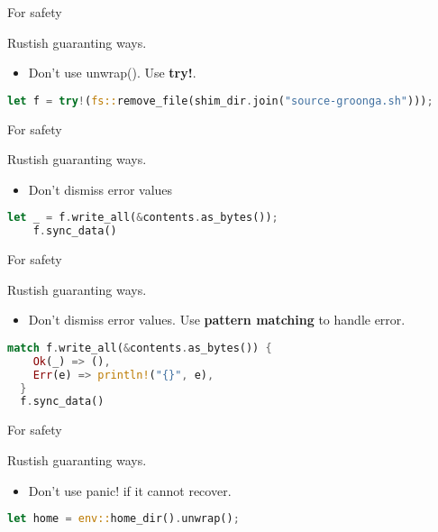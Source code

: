 \documentclass[12pt, unicode]{beamer}
\begin{document}
\begin{frame}[fragile]{For safety}
  \begin{block}{}
    Rustish guaranting ways.
  \end{block}
\begin{itemize}
\item<1-> Don't use unwrap(). Use \textbf{try!}.
\end{itemize}
  \begin{lstlisting}[language={Rust},basicstyle=\ttfamily\SSmall]
    let f = try!(fs::remove_file(shim_dir.join("source-groonga.sh")));
  \end{lstlisting}
\end{frame}

\begin{frame}[fragile]{For safety}
  \begin{block}{}
    Rustish guaranting ways.
  \end{block}
\begin{itemize}
\item<1-> Don't dismiss error values
\end{itemize}
  \begin{lstlisting}[language={Rust},basicstyle=\ttfamily\SSmall]
    let _ = f.write_all(&contents.as_bytes());
    f.sync_data()
  \end{lstlisting}
\end{frame}

\begin{frame}[fragile]{For safety}
  \begin{block}{}
    Rustish guaranting ways.
  \end{block}
\begin{itemize}
\item<1-> Don't dismiss error values. Use \textbf{pattern matching} to handle error.
\end{itemize}
\begin{lstlisting}[language={Rust},basicstyle=\ttfamily\SSmall]
  match f.write_all(&contents.as_bytes()) {
    Ok(_) => (),
    Err(e) => println!("{}", e),
  }
  f.sync_data()
  \end{lstlisting}
\end{frame}

\begin{frame}[fragile]{For safety}
  \begin{block}{}
    Rustish guaranting ways.
  \end{block}
\begin{itemize}
\item<1-> Don't use panic! if it cannot recover.
\end{itemize}
  \begin{lstlisting}[language={Rust},basicstyle=\ttfamily\SSmall]
    let home = env::home_dir().unwrap();
  \end{lstlisting}
\end{frame}
\end{document}
